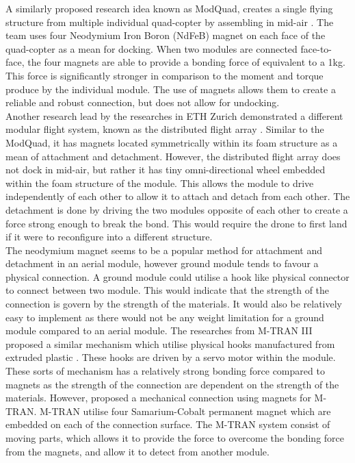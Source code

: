 \documentclass[12pt,A4]{article}
\begin{document}
	A similarly proposed research idea known as ModQuad, creates a single flying structure from multiple individual quad-copter by assembling in mid-air \citep{saldana2018modquad}. The team uses four Neodymium Iron Boron (NdFeB) magnet on each face of the quad-copter as a mean for docking. When two modules are connected face-to-face, the four magnets are able to provide a bonding force of equivalent to a 1kg. This force is significantly stronger in comparison to the moment and torque produce by the individual module. The use of magnets allows them to create a reliable and robust connection, but does not allow for undocking.\\
	
	Another research lead by the researches in ETH Zurich demonstrated a different modular flight system, known as the distributed flight array \citep{oung2011distributed}. Similar to the ModQuad, it has magnets located symmetrically within its foam structure as a mean of attachment and detachment. However, the distributed flight array does not dock in mid-air, but rather it has tiny omni-directional wheel embedded within the foam structure of the module. This allows the module to drive independently of each other to allow it to attach and detach from each other. The detachment is done by driving the two modules opposite of each other to create a force strong enough to break the bond. This would require the drone to first land if it were to reconfigure into a different structure.\\
	
	The neodymium magnet seems to be a popular method for attachment and detachment in an aerial module, however ground module tends to favour a physical connection. A ground module could utilise a hook like physical connector to connect between two module. This would indicate that the strength of the connection is govern by the strength of the materials. It would also be relatively easy to implement as there would not be any weight limitation for a ground module compared to an aerial module. The researches from M-TRAN III proposed a similar mechanism which utilise physical hooks manufactured from extruded plastic \citep{kurokawa2008distributed}. These hooks are driven by a servo motor within the module. These sorts of mechanism has a relatively strong bonding force compared to magnets as the strength of the connection are dependent on the strength of the materials. However, \citep{murata2002m-tran} proposed a mechanical connection using magnets for M-TRAN. M-TRAN utilise four Samarium-Cobalt permanent magnet which are embedded on each of the connection surface. The M-TRAN system consist of moving parts, which allows it to provide the force to overcome the bonding force from the magnets, and allow it to detect from another module.\\
	
\end{document}

